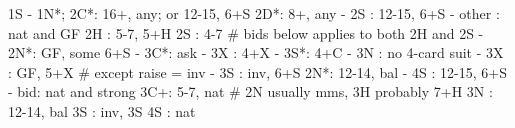 1S - 1N*; 2C*: 16+, any; or 12-15, 6+S
2D*: 8+, any
   - 2S : 12-15, 6+S
   - other : nat and GF
2H : 5-7, 5+H
2S : 4-7
# bids below applies to both 2H and 2S
   - 2N*: GF, some 6+S
        - 3C*: ask
             - 3X : 4+X
             - 3S*: 4+C
             - 3N : no 4-card suit
   - 3X : GF, 5+X  # except raise = inv
   - 3S : inv, 6+S
2N*: 12-14, bal
   - 4S : 12-15, 6+S
   - bid: nat and strong
3C+: 5-7, nat  # 2N usually mms, 3H probably 7+H
3N : 12-14, bal
3S : inv, 3S
4S : nat